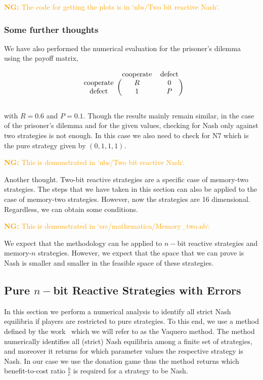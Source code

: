 \documentclass{article}
\theoremstyle{definition}
\newcommand{\nikoleta}[1]{\textcolor{orange}{{\bf NG:} #1}}
\begin{document}
\nikoleta{The code for getting the plots is in `nbs/Two bit reactive Nash`.}

\subsubsection{Some further thoughts}

We have also performed the numerical evaluation for the prisoner's dilemma using
the payoff matrix,

\begin{equation}
  \begin{blockarray}{ccc}
      & \text{cooperate} & \text{defect} \\
      \begin{block}{c(cc)}
          \text{cooperate} & R & 0 \\
          \text{defect} & 1 & P \\
      \end{block}
  \end{blockarray}
\end{equation}

with \(R=0.6\) and \(P=0.1\). Though the results mainly remain similar, in the
case of the prisoner's dilemma and for the given values, checking for Nash only
against two strategies is not enough. In this case we also need to check for N7
which is the pure strategy given by \((0, 1, 1, 1)\).

\nikoleta{This is demonstrated in `nbs/Two bit reactive Nash`.}

Another thought. Two-bit reactive strategies are a specific case of memory-two
strategies. The steps that we have taken in this section can also be applied to
the case of memory-two strategies. However, now the strategies are 16
dimensional. Regardless, we can obtain some conditions.

\nikoleta{This is demonstrated in `src/mathematica/Memory\_two.nb`.}

We expect that the methodology can be applied to \(n-\)bit reactive strategies
and memory-\(n\) strategies. However, we expect that the space that we can prove
is Nash is smaller and smaller in the feasible space of these strategies.

\subsection{Pure \(n-\)bit Reactive Strategies with Errors}\label{section:pure_strategies}

In this section we perform a numerical analysis to identify all strict Nash
equilibria if players are restricted to pure strategies. To this end, we use a
method defined by the work~\citep{hilbe:PNAS:2017} which we will refer to as the
Vaquero method. The method numerically identifies all (strict) Nash equilibria
among a finite set of strategies, and moreover it returns for which parameter
values the respective strategy is Nash. In our case we use the donation game
thus the method returns which benefit-to-cost ratio \(\frac{b}{c}\) is required
for a strategy to be Nash.
\end{document}
